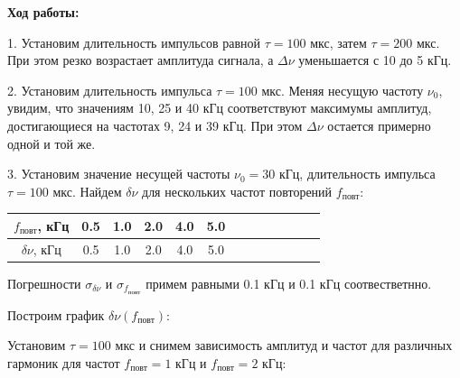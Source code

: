 \documentclass[14pt]{article}
\begin{document}
\vspace{1cm}
\textbf{Ход работы:}

1. Установим длительность импульсов равной $\tau = 100$ мкс, затем $\tau = 200$ мкс. При этом резко возрастает амплитуда сигнала, а $\Delta\nu$ уменьшается с 10 до 5 кГц.

2. Установим длительность импульса $\tau = 100$ мкс. Меняя несущую частоту $\nu_0$, увидим, что значениям 10, 25 и 40 кГц соответствуют максимумы амплитуд, достигающиеся на частотах 9, 24 и 39 кГц. При этом $\Delta\nu$ остается примерно одной и той же.

3. Установим значение несущей частоты $\nu_0 = 30$ кГц, длительность импульса $\tau = 100$ мкс. Найдем $\delta\nu$ для нескольких частот повторений $f_{\text{повт}}$:	

\begin{center}
\begin{tabular}{|c|c|c|c|c|c|c|c|c|c|c|c|c|}
\hline
$f_{\text{повт}}$, кГц	&	0.5	&	1.0	&	2.0	&	4.0	&	5.0	\\
\hline
$\delta\nu$, кГц		&	0.5	&	1.0	&	2.0	&	4.0	&	5.0	\\
\hline
\end{tabular}
\end{center}

Погрешности $\sigma_{\delta\nu}$ и $\sigma_{f_{\text{повт}}}$ примем равными 0.1 кГц и 0.1 кГц соотвестветнно.

Построим график $\delta\nu(f_{\text{повт}})$:


\vspace{1cm}
Установим $\tau = 100$ мкс и снимем зависимость амплитуд и частот для различных гармоник для частот $f_{\text{повт}} = 1$ кГц и $f_{\text{повт}} = 2$ кГц:
\end{document}
